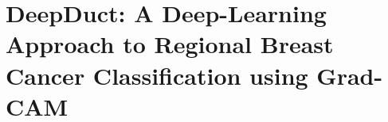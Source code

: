 

\chapter{DeepDuct: A Deep-Learning Approach to Regional Breast Cancer Classification using Grad-CAM}



